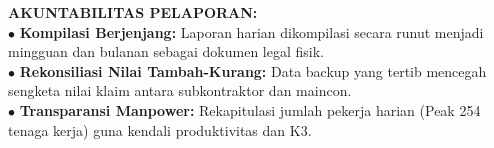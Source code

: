 \documentclass[10pt,a4paper,landscape]{article}
\begin{document}
\begin{minipage}[t]{0.30\linewidth}
  \begin{tcolorbox}[sharp corners, boxrule=0.6pt, colframe=pnavy, colback=pbglight, left=2.5mm, right=2.5mm, top=2mm, bottom=2mm, height=54mm]
    {\fontsize{7pt}{8.5pt}\selectfont\bfseries\color{pnavy}AKUNTABILITAS PELAPORAN:}\\[1.5mm]
    {\fontsize{6.5pt}{8.2pt}\selectfont\color{psteel}
    $\bullet$ \textbf{Kompilasi Berjenjang:} Laporan harian dikompilasi secara runut menjadi mingguan dan bulanan sebagai dokumen legal fisik.\\
    $\bullet$ \textbf{Rekonsiliasi Nilai Tambah-Kurang:} Data backup yang tertib mencegah sengketa nilai klaim antara subkontraktor dan maincon.\\
    $\bullet$ \textbf{Transparansi Manpower:} Rekapitulasi jumlah pekerja harian (Peak 254 tenaga kerja) guna kendali produktivitas dan K3.
    }
  \end{tcolorbox}
\end{minipage}%
\hfill
\end{document}
